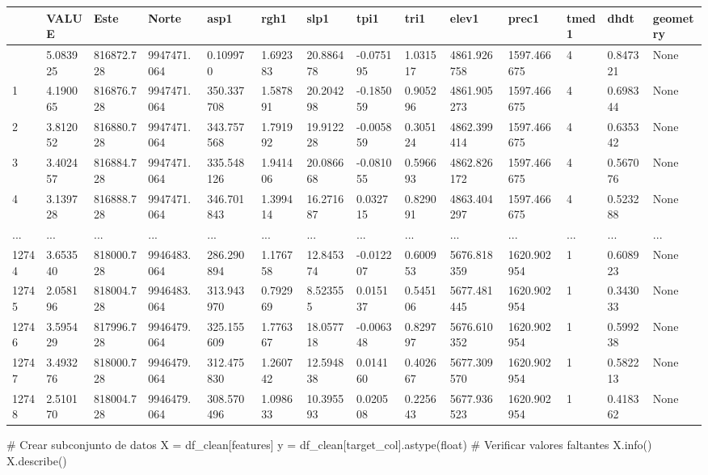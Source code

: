 \documentclass[
  letterpaper,
  DIV=11,
  numbers=noendperiod]{scrartcl}
\newenvironment{Shaded}{\begin{snugshade}}{\end{snugshade}}
\newcommand{\BuiltInTok}[1]{\textcolor[rgb]{0.00,0.23,0.31}{#1}}
\newcommand{\CommentTok}[1]{\textcolor[rgb]{0.37,0.37,0.37}{#1}}
\newcommand{\NormalTok}[1]{\textcolor[rgb]{0.00,0.23,0.31}{#1}}
\newcommand{\OperatorTok}[1]{\textcolor[rgb]{0.37,0.37,0.37}{#1}}
\begin{document}
\begin{longtable}[]{@{}llllllllllllll@{}}
\toprule\noalign{}
& VALUE & Este & Norte & asp1 & rgh1 & slp1 & tpi1 & tri1 & elev1 &
prec1 & tmed1 & dhdt & geometry \\
\midrule\noalign{}
\endhead
\bottomrule\noalign{}
\endlastfoot
0 & 5.083925 & 816872.728 & 9947471.064 & 0.109970 & 1.692383 &
20.886478 & -0.075195 & 1.031517 & 4861.926758 & 1597.466675 & 4 &
0.847321 & None \\
1 & 4.190065 & 816876.728 & 9947471.064 & 350.337708 & 1.587891 &
20.204298 & -0.185059 & 0.905296 & 4861.905273 & 1597.466675 & 4 &
0.698344 & None \\
2 & 3.812052 & 816880.728 & 9947471.064 & 343.757568 & 1.791992 &
19.912228 & -0.005859 & 0.305124 & 4862.399414 & 1597.466675 & 4 &
0.635342 & None \\
3 & 3.402457 & 816884.728 & 9947471.064 & 335.548126 & 1.941406 &
20.086668 & -0.081055 & 0.596693 & 4862.826172 & 1597.466675 & 4 &
0.567076 & None \\
4 & 3.139728 & 816888.728 & 9947471.064 & 346.701843 & 1.399414 &
16.271687 & 0.032715 & 0.829091 & 4863.404297 & 1597.466675 & 4 &
0.523288 & None \\
... & ... & ... & ... & ... & ... & ... & ... & ... & ... & ... & ... &
... & ... \\
12744 & 3.653540 & 818000.728 & 9946483.064 & 286.290894 & 1.176758 &
12.845374 & -0.012207 & 0.600953 & 5676.818359 & 1620.902954 & 1 &
0.608923 & None \\
12745 & 2.058196 & 818004.728 & 9946483.064 & 313.943970 & 0.792969 &
8.523555 & 0.015137 & 0.545106 & 5677.481445 & 1620.902954 & 1 &
0.343033 & None \\
12746 & 3.595429 & 817996.728 & 9946479.064 & 325.155609 & 1.776367 &
18.057718 & -0.006348 & 0.829797 & 5676.610352 & 1620.902954 & 1 &
0.599238 & None \\
12747 & 3.493276 & 818000.728 & 9946479.064 & 312.475830 & 1.260742 &
12.594838 & 0.014160 & 0.402667 & 5677.309570 & 1620.902954 & 1 &
0.582213 & None \\
12748 & 2.510170 & 818004.728 & 9946479.064 & 308.570496 & 1.098633 &
10.395593 & 0.020508 & 0.225643 & 5677.936523 & 1620.902954 & 1 &
0.418362 & None \\
\end{longtable}

\begin{Shaded}
\begin{Highlighting}[]
\CommentTok{\# Crear subconjunto de datos}
\NormalTok{X }\OperatorTok{=}\NormalTok{ df\_clean[features]}
\NormalTok{y }\OperatorTok{=}\NormalTok{ df\_clean[target\_col].astype(}\BuiltInTok{float}\NormalTok{)}
\CommentTok{\# Verificar valores faltantes}
\NormalTok{X.info()}
\NormalTok{X.describe()}
\end{Highlighting}
\end{Shaded}
\end{document}
